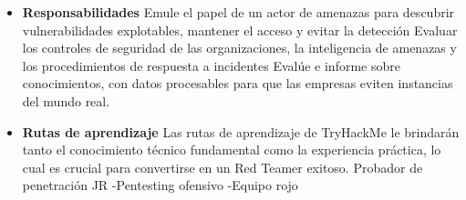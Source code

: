 \begin{itemize}
\begin{itemize} \item \textbf{Responsabilidades}
Emule el papel de un actor de amenazas para descubrir vulnerabilidades explotables, mantener el acceso y evitar la detección
Evaluar los controles de seguridad de las organizaciones, la inteligencia de amenazas y los procedimientos de respuesta a incidentes
Evalúe e informe sobre conocimientos, con datos procesables para que las empresas eviten instancias del mundo real. \\
\item \textbf{Rutas de aprendizaje}
Las rutas de aprendizaje de TryHackMe le brindarán tanto el conocimiento técnico fundamental como la experiencia práctica, lo cual es crucial para convertirse en un Red Teamer exitoso.
%
Probador de penetración JR
-Pentesting ofensivo
-Equipo rojo
\end{itemize}
\end{itemize}




